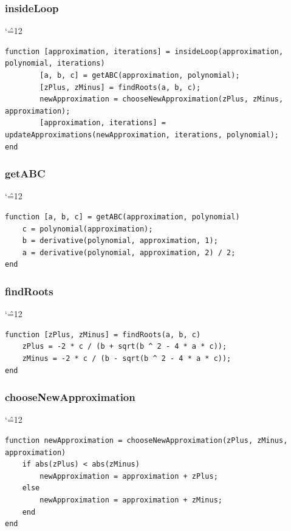 \documentclass[12pt]{report}
\newenvironment{simplechar}{%
   \catcode`\^=12
}{}
\begin{document}
\subsubsection{insideLoop}
\begin{simplechar}
\begin{lstlisting}
function [approximation, iterations] = insideLoop(approximation, polynomial, iterations)
        [a, b, c] = getABC(approximation, polynomial);
        [zPlus, zMinus] = findRoots(a, b, c);
        newApproximation = chooseNewApproximation(zPlus, zMinus, approximation);
        [approximation, iterations] = updateApproximations(newApproximation, iterations, polynomial);
end
\end{lstlisting}
\end{simplechar}

\subsubsection{getABC}
\begin{simplechar}
\begin{lstlisting}
function [a, b, c] = getABC(approximation, polynomial)
    c = polynomial(approximation);
    b = derivative(polynomial, approximation, 1);
    a = derivative(polynomial, approximation, 2) / 2;
end
\end{lstlisting}
\end{simplechar}

\subsubsection{findRoots}
\begin{simplechar}
\begin{lstlisting}
function [zPlus, zMinus] = findRoots(a, b, c)
    zPlus = -2 * c / (b + sqrt(b ^ 2 - 4 * a * c));
    zMinus = -2 * c / (b - sqrt(b ^ 2 - 4 * a * c));
end
\end{lstlisting}
\end{simplechar}

\subsubsection{chooseNewApproximation}
\begin{simplechar}
\begin{lstlisting}
function newApproximation = chooseNewApproximation(zPlus, zMinus, approximation)
    if abs(zPlus) < abs(zMinus)
        newApproximation = approximation + zPlus;
    else
        newApproximation = approximation + zMinus;
    end
end
\end{lstlisting}
\end{simplechar}
\end{document}
